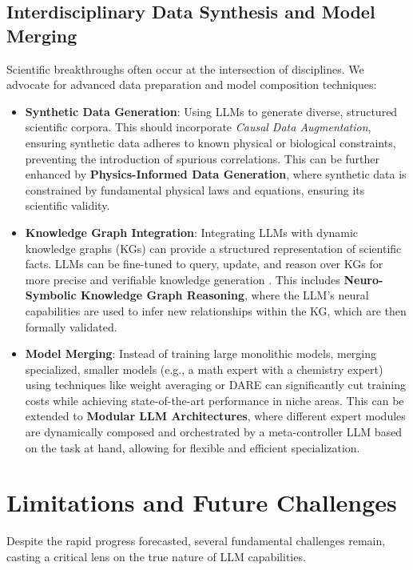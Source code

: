 \documentclass{article}
\begin{document}
\subsection{Interdisciplinary Data Synthesis and Model Merging}
Scientific breakthroughs often occur at the intersection of disciplines. We advocate for advanced data preparation and model composition techniques:
\begin{itemize}
    \item \textbf{Synthetic Data Generation}: Using LLMs to generate diverse, structured scientific corpora. This should incorporate \textit{Causal Data Augmentation}, ensuring synthetic data adheres to known physical or biological constraints, preventing the introduction of spurious correlations. This can be further enhanced by \textbf{Physics-Informed Data Generation}, where synthetic data is constrained by fundamental physical laws and equations, ensuring its scientific validity.
    \item \textbf{Knowledge Graph Integration}: Integrating LLMs with dynamic knowledge graphs (KGs) can provide a structured representation of scientific facts. LLMs can be fine-tuned to query, update, and reason over KGs for more precise and verifiable knowledge generation \cite{wang2023knowledgegraph}. This includes \textbf{Neuro-Symbolic Knowledge Graph Reasoning}, where the LLM's neural capabilities are used to infer new relationships within the KG, which are then formally validated.
    \item \textbf{Model Merging}: Instead of training large monolithic models, merging specialized, smaller models (e.g., a math expert with a chemistry expert) using techniques like weight averaging \cite{wortsman2022model} or DARE \cite{yu2023dare} can significantly cut training costs while achieving state-of-the-art performance in niche areas. This can be extended to \textbf{Modular LLM Architectures}, where different expert modules are dynamically composed and orchestrated by a meta-controller LLM based on the task at hand, allowing for flexible and efficient specialization.
\end{itemize}

\section{Limitations and Future Challenges}
Despite the rapid progress forecasted, several fundamental challenges remain, casting a critical lens on the true nature of LLM capabilities.
\end{document}
